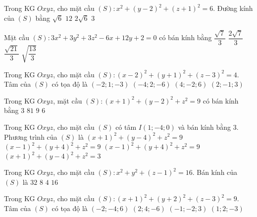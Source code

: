 \begin{ex}%
	Trong KG $Oxyz$, cho mặt cầu $(S)\colon x^2+(y-2)^2+(z+1)^2=6$. Đường kính của $(S)$ bằng
	\choice
	{$\sqrt{6}$}
	{$12$}
	{\True $2\sqrt{6}$}
	{$3$}
\end{ex}

\begin{ex}%
	Mặt cầu $(S)\colon3x^2+3y^2+3z^2-6x+12y+2=0$ có bán kính bằng
	\choice
	{$\dfrac{\sqrt{7}}{3}$}
	{$\dfrac{2\sqrt{7}}{3}$}
	{$\dfrac{\sqrt{21}}{3}$}
	{\True $\sqrt{\dfrac{13}{3}}$}
\end{ex}

\begin{ex}%
	Trong KG $Oxyz$, cho mặt cầu $(S)\colon(x-2)^2+(y+1)^2+(z-3)^2=4$. Tâm của $(S)$ có tọa độ là
	\choice
	{$(-2;1;-3)$}
	{$(-4;2;-6)$}
	{$(4;-2;6)$}
	{\True $(2;-1;3)$}
\end{ex}

\begin{ex}%
	Trong KG $Oxyz$, mặt cầu $(S)\colon (x+1)^2+(y-2)^2+z^2=9$ có bán kính bằng
	\choice
	{\True $3$}
	{$81$}
	{$9$}
	{$6$}
\end{ex}
	
\begin{ex}%
	Trong KG $Oxyz$, cho mặt cầu $(S)$ có tâm $I(1;-4;0)$ và bán kính bằng $3$. Phương trình của $(S)$ là
	\choice
	{$(x+1)^2+(y-4)^2+z^2=9$}
	{$(x-1)^2+(y+4)^2+z^2=9$}
	{\True $(x-1)^2+(y+4)^2+z^2=9$}
	{$(x+1)^2+(y-4)^2+z^2=3$}
\end{ex}	
	
\begin{ex}%
	Trong KG $Oxyz$, cho mặt cầu $(S)\colon x^2+y^2+(z-1)^2=16$. Bán kính của $(S)$ là
	\choice
	{$32$}
	{$8$}
	{$4$}
	{$16$}
\end{ex}	
	
\begin{ex}%
	Trong KG $Oxyz$, cho mặt cầu $(S)\colon (x+1)^2+(y+2)^2+(z-3)^2=9$. Tâm của $(S)$ có tọa độ là
	\choice
	{$(-2;-4;6)$}
	{$(2;4;-6)$}
	{\True $(-1;-2;3)$}
	{$(1;2;-3)$}
\end{ex}
	

